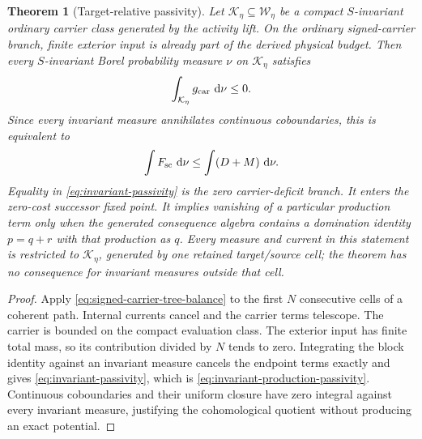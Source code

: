 \documentclass[11pt]{article}
\numberwithin{section}{part}
\theoremstyle{plain}
\newtheorem{theorem}{Theorem}[section]
\theoremstyle{definition}
\theoremstyle{remark}
\newcommand{\dd}{\,\mathrm d}
\begin{document}
\begin{theorem}[Target-relative passivity]
\label{thm:target-relative-passivity}
Let \(\mathcal K_\eta\subseteq\mathscr W_\eta\) be a compact
\(S\)-invariant ordinary carrier class generated by the activity lift.  On the
ordinary signed-carrier branch, finite exterior input is already part of the
derived physical budget.  Then every
\(S\)-invariant Borel probability measure \(\nu\) on \(\mathcal K_\eta\)
satisfies
\begin{equation}
 \label{eq:invariant-passivity}
 \int_{\mathcal K_\eta}g_{\rm car}\,\dd\nu\le0.
\end{equation}
Since every invariant measure annihilates continuous coboundaries, this is
equivalent to
\begin{equation}
 \label{eq:invariant-production-passivity}
 \int F_{\rm sc}\,\dd\nu
 \le\int(D+M)\,\dd\nu.
\end{equation}
Equality in \eqref{eq:invariant-passivity} is the zero carrier-deficit branch.
It enters the zero-cost successor fixed point.  It implies vanishing of a
particular production term only when the generated consequence algebra
contains a domination identity \(p=q+r\) with that production as \(q\).
Every measure and current in this statement is restricted to
\(\mathcal K_\eta\), generated by one retained target/source cell; the
theorem has no consequence for invariant measures outside that cell.
\end{theorem}

\begin{proof}
Apply \eqref{eq:signed-carrier-tree-balance} to the first \(N\) consecutive
cells of a coherent path.  Internal currents cancel and the carrier terms
telescope.  The carrier is bounded on the compact evaluation class.  The exterior input has finite total mass, so its
contribution divided by \(N\) tends to zero.  Integrating the block identity
against an invariant measure cancels the endpoint terms exactly and gives
\eqref{eq:invariant-passivity}, which is
\eqref{eq:invariant-production-passivity}.  Continuous coboundaries and their
uniform closure have zero integral against every invariant measure, justifying
the cohomological quotient without producing an exact potential.
\end{proof}
\end{document}
